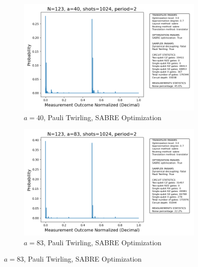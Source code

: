 \documentclass[conference,twoside]{IEEEtran}
\begin{document}
\begin{figure}[!htbp]
    \begin{subfigure}{0.37\textwidth}
        \centering
        \includegraphics[width=\textwidth]{prob_dist_N123_a40_backend_ibmqpu_PT1_SO1.png}
        \caption{$a=40$, Pauli Twirling, SABRE Optimization}
    \end{subfigure}
    \hfill
    \begin{subfigure}{0.37\textwidth}
        \centering
        \includegraphics[width=\textwidth]{prob_dist_N123_a83_backend_ibmqpu_PT1_SO1.png}
        \caption{$a=83$, Pauli Twirling, SABRE Optimization}
    \end{subfigure}

    \vspace{0pt}


\end{figure}
\end{document}
